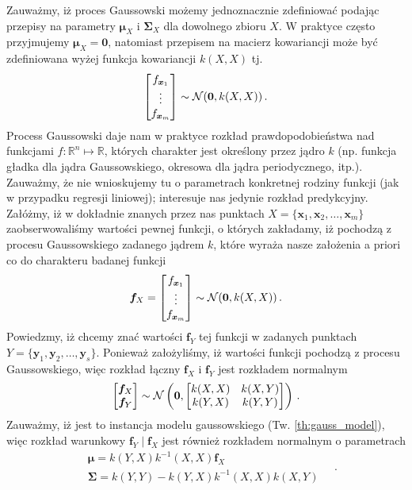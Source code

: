 \documentclass{myclass}
\numberwithin{equation}{subsection}
\begin{document}
Zauważmy, iż proces Gaussowski możemy jednoznacznie zdefiniować podając przepisy na parametry
\(\bm{\mu}_X\) i \(\bm{\Sigma}_X\) dla dowolnego zbioru \(X\). W praktyce często przyjmujemy
\(\bm{\mu}_X = \bm{0}\), natomiast przepisem na macierz kowariancji może być zdefiniowana wyżej
funkcja kowariancji \(k(X,X)\) tj.
\begin{equation}
    \mqty[f_{\bm{x}_1} \\ \vdots \\ f_{\bm{x}_m}] \sim \mc{N}(\bm{0}, k(X,X))\,.
\end{equation}
Process Gaussowski daje nam w praktyce rozkład prawdopodobieństwa nad funkcjami
\(f:\mathbb{R}^n\mapsto\mathbb{R}\), których charakter jest określony przez jądro \(k\) (np. funkcja
gładka dla jądra Gaussowskiego, okresowa dla jądra periodycznego, itp.). Zauważmy, że nie
wnioskujemy tu o parametrach konkretnej rodziny funkcji (jak w przypadku regresji liniowej);
interesuje nas jedynie rozkład predykcyjny. Załóżmy, iż w dokładnie znanych przez nas punktach \(X =
\{\bm{x}_1,\bm{x}_2,\ldots,\bm{x}_m\}\) zaobserwowaliśmy wartości pewnej funkcji, o których
zakładamy, iż pochodzą z procesu Gaussowskiego zadanego jądrem \(k\), które wyraża nasze założenia a
priori co do charakteru badanej funkcji
\begin{equation}
    \bm{f}_X = \mqty[f_{\bm{x}_1} \\ \vdots \\ f_{\bm{x}_m}] \sim \mc{N}(\bm{0}, k(X,X))\,.
\end{equation}
Powiedzmy, iż chcemy znać wartości \(\bm{f}_Y\) tej funkcji w zadanych punktach \(Y =
\{\bm{y}_1,\bm{y}_2,\ldots,\bm{y}_s\}\). Ponieważ założyliśmy, iż wartości funkcji pochodzą z
procesu Gaussowskiego, więc rozkład łączny \(\bm{f}_X\) i \(\bm{f}_Y\) jest rozkładem normalnym
\begin{equation}
    \mqty[\bm{f}_X \\ \bm{f}_Y] \sim \mc{N}\left(\bm{0}, \mqty[k(X,X) & k(X,Y) \\ k(Y,X) & k(Y,Y)]\right)\,.
\end{equation}
Zauważmy, iż jest to instancja modelu gaussowskiego (Tw. \ref{th:gauss_model}), więc rozkład
warunkowy \(\bm{f}_Y\mid \bm{f}_X\) jest również rozkładem normalnym o parametrach
\begin{equation}
    \begin{split}
        &\bm{\mu} = k(Y,X)k^{-1}(X,X)\bm{f}_X\\
        &\bm{\Sigma} = k(Y,Y) - k(Y,X)k^{-1}(X,X)k(X,Y)
    \end{split}\quad.
\end{equation}
\end{document}
